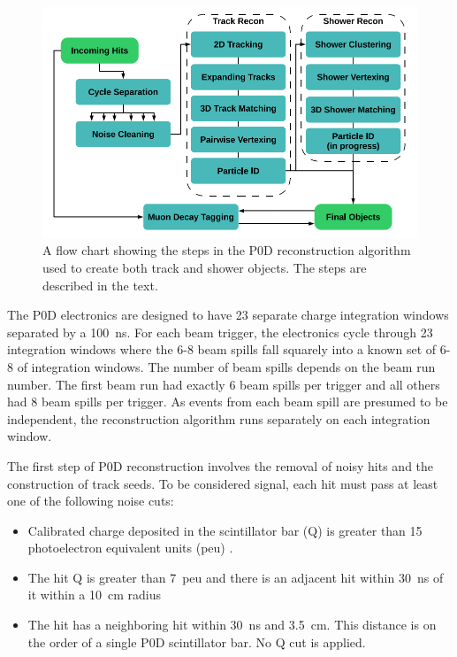 \begin{figure}
\centering
\includegraphics[width=6in]{Figures/Reconstruction/p0drecoflow.PNG}
\caption{A flow chart showing the steps in the P0D reconstruction algorithm used to create both track and shower objects. The steps are described in the text.} 
\label{fig:p0drecoflow}
\end{figure}

The P0D electronics are designed to have 23 separate charge integration windows separated by a 100~ns. For each beam trigger, the electronics cycle through 23 integration windows where the 6-8 beam spills fall squarely into a known set of 6-8 of integration windows. The number of beam spills depends on the beam run number. The first beam run had exactly 6 beam spills per trigger and all others had 8 beam spills per trigger. As events from each beam spill are presumed to be independent, the reconstruction algorithm runs separately on each integration window. 

The first step of P0D reconstruction involves the removal of noisy hits and the construction of track seeds. To be considered signal, each hit must pass at least one of the following noise cuts:

\begin{itemize}
\item Calibrated charge deposited in the scintillator bar (Q) is greater than 15 photoelectron equivalent units (peu) .
\item The hit Q is greater than 7~peu and there is an adjacent hit within 30~ns of it within a 10~cm radius
\item The hit has a neighboring hit within 30~ns and 3.5~cm. This distance is on the order of a single P0D scintillator bar. No Q cut is applied.
\end{itemize}

